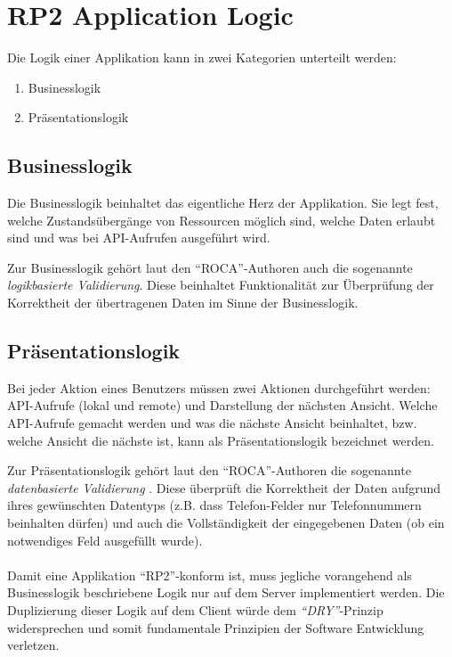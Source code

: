 \section{RP2 Application Logic}
\label{sec:principle-rp2-application-logic}


Die Logik einer Applikation kann in zwei Kategorien unterteilt werden:
\begin{enumerate}
	\item Businesslogik
	\item Präsentationslogik
\end{enumerate}

\subsection*{Businesslogik}
Die Businesslogik beinhaltet das eigentliche Herz der Applikation. Sie legt fest, welche Zustandsübergänge von Ressourcen möglich sind, welche Daten erlaubt sind und was bei API-Aufrufen ausgeführt wird.

Zur Businesslogik gehört laut den ``ROCA''-Authoren auch die sogenannte \emph{logikbasierte Validierung}. Diese beinhaltet \cite{ObjektspektrumROCA} Funktionalität zur Überprüfung der Korrektheit der übertragenen Daten im Sinne der Businesslogik.

\subsection*{Präsentationslogik}
Bei jeder Aktion eines Benutzers müssen zwei Aktionen durchgeführt werden: API-Aufrufe (lokal und remote) und Darstellung der nächsten Ansicht. Welche API-Aufrufe gemacht werden und was die nächste Ansicht beinhaltet, bzw. welche Ansicht die nächste ist, kann als Präsentationslogik bezeichnet werden.

Zur Präsentationslogik gehört laut den ``ROCA''-Authoren die sogenannte \emph{datenbasierte Validierung} \cite{ObjektspektrumROCA}. Diese überprüft die Korrektheit der Daten aufgrund ihres gewünschten Datentyps (z.B. dass Telefon-Felder nur Telefonnummern beinhalten dürfen) und auch die Vollständigkeit der eingegebenen Daten (ob ein notwendiges Feld ausgefüllt wurde).
\\ \\
Damit eine Applikation ``RP2''-konform ist, muss jegliche vorangehend als Businesslogik beschriebene Logik nur auf dem Server implementiert werden. Die Duplizierung dieser Logik auf dem Client würde dem \emph{``\gls{DRY}''}-Prinzip widersprechen und somit fundamentale Prinzipien der Software Entwicklung verletzen.

